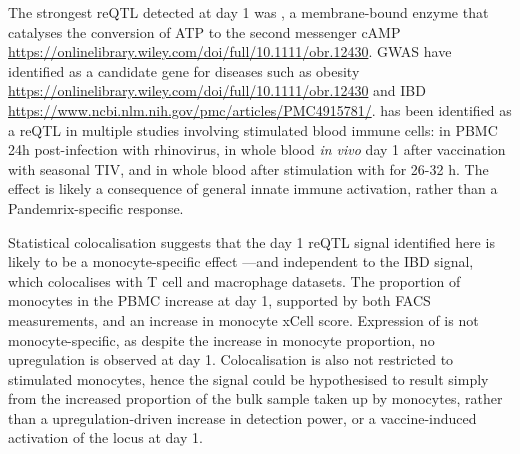 The strongest \gls{reQTL} detected at day 1 was , a membrane-bound enzyme that catalyses the conversion of ATP to the second messenger cAMP \url{https://onlinelibrary.wiley.com/doi/full/10.1111/obr.12430}.
\gls{GWAS} have identified  as a candidate gene for diseases such as obesity \url{https://onlinelibrary.wiley.com/doi/full/10.1111/obr.12430} and IBD \url{https://www.ncbi.nlm.nih.gov/pmc/articles/PMC4915781/}.
%
 has been identified as a reQTL in multiple studies involving stimulated blood immune cells:
in \gls{PBMC} 24h post-infection with rhinovirus\autocite{caliskan2015HostGeneticVariation},
in whole blood \textit{in vivo} day 1 after vaccination with seasonal \gls{TIV}\autocite{franco2013IntegrativeGenomicAnalysis},
and in whole blood after stimulation with  for 26-32 h\autocite{manry2017DecipheringGeneticControl}.
The effect is likely a consequence of general innate immune activation, rather than a Pandemrix-specific response.

Statistical colocalisation suggests that the day 1 reQTL signal identified here is likely to be a monocyte-specific effect
---and independent to the IBD signal, which colocalises with T cell and macrophage datasets.
The proportion of monocytes in the PBMC increase at day 1, supported by both FACS\autocite{sobolev2016AdjuvantedInfluenzaH1N1Vaccination} measurements, and an increase in monocyte xCell score.
Expression of  is not monocyte-specific, as despite the increase in monocyte proportion, no upregulation is observed at day 1.
Colocalisation is also not restricted to stimulated monocytes,
hence the signal could be hypothesised to result simply from the increased proportion of the bulk sample taken up by monocytes,
rather than a upregulation-driven increase in detection power,
or a vaccine-induced activation of the locus at day 1.


